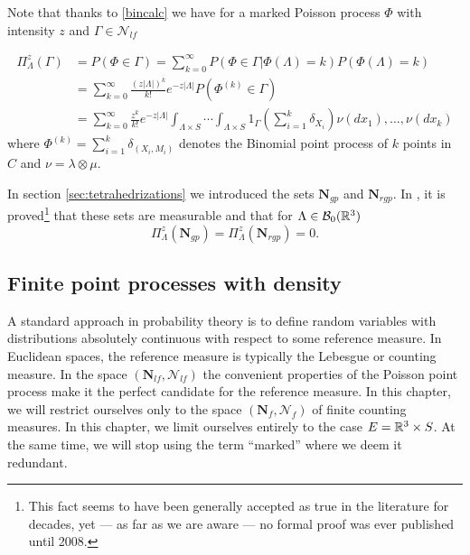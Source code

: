 
Note that thanks to \ref{bincalc} we have for a marked Poisson process $\Phi$ with intensity $z$ and $\Gamma \in \mathcal N_{lf}$ 

\begin{align}\label{eq:poiscalc}
	\Pi^z_\Lambda(\Gamma) &= P(\Phi \in \Gamma) = \sum^\infty_{k=0} P(\Phi \in \Gamma | \Phi(\Lambda) = k) P(\Phi(\Lambda)=k) \\
	& = \sum^\infty_{k=0} \frac{(z|\Lambda|)^k}{k!} e^{-z|\Lambda|} P(\Phi^{(k)}\in \Gamma) \nonumber \\ 
	& = \sum^\infty_{k=0} \frac{z^k}{k!} e^{-z|\Lambda|} \int_{\Lambda\times S} \cdots \int_{\Lambda\times S} 1_{\Gamma} \left(\sum^k_{i=1} \delta_{X_i}\right) \nu(dx_1), \dots, \nu(dx_k) \nonumber
\end{align}
where $\Phi^{(k)} = \sum^k_{i=1}\delta_{(X_i,M_i)}$ denotes the Binomial point process of $k$ points in $C$ and $\nu=\lambda \otimes \mu$. 

\begin{remark}
	In section \ref{sec:tetrahedrizations} we introduced the sets $\mathbf N_{gp}$ and $\mathbf N_{rgp}$. In \cite{Zessin2008}, it is proved\footnote{This fact seems to have been generally accepted as true in the literature for decades, yet --- as far as we are aware --- no formal proof was ever published until 2008.} that these sets are measurable and that for $\Lambda \in \mathcal B_0({\mathbb R^3})$
	$$\Pi^z_{\Lambda}(\mathbf N_{gp}) = \Pi^z_{\Lambda}(\mathbf N_{rgp})=0.$$
\end{remark}

\subsection{Finite point processes with density}
A standard approach in probability theory is to define random variables with distributions absolutely continuous with respect to some reference measure. In Euclidean spaces, the reference measure is typically the Lebesgue or counting measure. In the space $(\mathbf N_{lf},\mathcal N_{lf})$ the convenient properties of the Poisson point process make it the perfect candidate for the reference measure. In this chapter, we will restrict ourselves only to the space $(\mathbf N_f,\mathcal N_f)$ of finite counting measures.
In this chapter, we limit ourselves entirely to the case $E={\mathbb R^3} \times S$. At the same time, we will stop using the term ``marked'' where we deem it redundant. 

